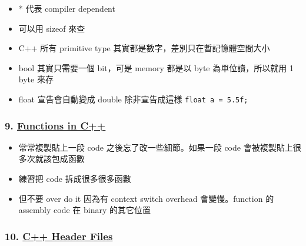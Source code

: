 \documentclass[11pt]{article}
\providecommand{\tightlist}{%
      \setlength{\itemsep}{0pt}\setlength{\parskip}{0pt}}
\begin{document}
\begin{itemize}
\tightlist
\item
  * 代表 compiler dependent
\item
  可以用 sizeof 來查
\item
  C++ 所有 primitive type 其實都是數字，差別只在暫記憶體空間大小
\item
  bool 其實只需要一個 bit，可是 memory 都是以 byte 為單位讀，所以就用 1
  byte 來存
\item
  float 宣告會自動變成 double 除非宣告成這樣 \texttt{float\ a\ =\ 5.5f;}
\end{itemize}

\hypertarget{functions-in-c}{%
\subsubsection{\texorpdfstring{9.
\href{https://www.youtube.com/watch?v=V9zuox47zr0\&list=PLlrATfBNZ98dudnM48yfGUldqGD0S4FFb\&index=9}{Functions
in C++}}{9. Functions in C++}}\label{functions-in-c}}

\begin{itemize}
\tightlist
\item
  常常複製貼上一段 code 之後忘了改一些細節。如果一段 code
  會被複製貼上很多次就該包成函數
\item
  練習把 code 拆成很多很多函數
\item
  但不要 over do it 因為有 context switch overhead 會變慢。function 的
  assembly code 在 binary 的其它位置
\end{itemize}

\hypertarget{c-header-files}{%
\subsubsection{\texorpdfstring{10.
\href{https://www.youtube.com/watch?v=9RJTQmK0YPI\&list=PLlrATfBNZ98dudnM48yfGUldqGD0S4FFb\&index=10}{C++
Header Files}}{10. C++ Header Files}}\label{c-header-files}}
\end{document}
